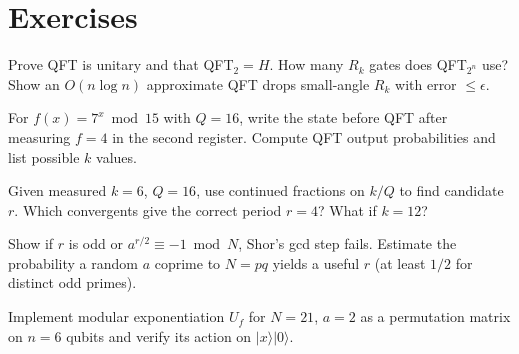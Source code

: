 \section{Exercises}
\begin{exercise}
Prove QFT is unitary and that QFT$_2=H$. How many $R_k$ gates does QFT$_{2^n}$ use? Show an $O(n\log n)$ approximate QFT drops small-angle $R_k$ with error $\le\epsilon$.
\end{exercise}
\begin{exercise}
For $f(x)=7^x\bmod15$ with $Q=16$, write the state before QFT after measuring $f=4$ in the second register. Compute QFT output probabilities and list possible $k$ values.
\end{exercise}
\begin{exercise}
Given measured $k=6$, $Q=16$, use continued fractions on $k/Q$ to find candidate $r$. Which convergents give the correct period $r=4$? What if $k=12$?
\end{exercise}
\begin{exercise}
Show if $r$ is odd or $a^{r/2}\equiv-1\bmod N$, Shor's gcd step fails. Estimate the probability a random $a$ coprime to $N=pq$ yields a useful $r$ (at least $1/2$ for distinct odd primes).
\end{exercise}
\begin{exercise}
Implement modular exponentiation $U_f$ for $N=21$, $a=2$ as a permutation matrix on $n=6$ qubits and verify its action on $\lvert x\rangle\lvert0\rangle$.
\end{exercise}
